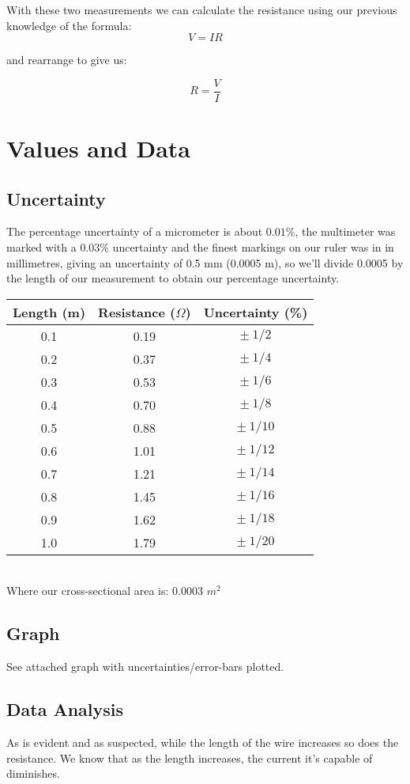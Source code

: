 \documentclass{article}
\begin{document}
With these two measurements we can calculate the resistance using our previous knowledge of the formula: \[V=IR\] \centerline{and rearrange to give us:} \[R=\frac{V}{I}\]

\clearpage

\section[Results]{Values and Data}
\subsection{Uncertainty}
The percentage uncertainty of a micrometer is about $0.01\%$, the multimeter was marked with a $0.03\%$ uncertainty and the finest markings on our ruler was in in millimetres, giving an uncertainty of 0.5 mm (0.0005 m), so we'll divide 0.0005 by the length of our measurement to obtain our percentage uncertainty.

\begin{center}
\begin{tabular}{ |c|c|c| }
 \hline
 Length (m) & Resistance ($\Omega$) & Uncertainty (\%) \\
 \hline
 0.1 & 0.19 & $\pm\ 1/2$ \\ 
 0.2 & 0.37 & $\pm\ 1/4$ \\  
 0.3 & 0.53 & $\pm\ 1/6$ \\
 0.4 & 0.70 & $\pm\ 1/8$ \\
 0.5 & 0.88 & $\pm\ 1/10$ \\
 0.6 & 1.01 & $\pm\ 1/12$ \\
 0.7 & 1.21 & $\pm\ 1/14$ \\
 0.8 & 1.45 & $\pm\ 1/16$ \\
 0.9 & 1.62 & $\pm\ 1/18$ \\
 1.0 & 1.79 & $\pm\ 1/20$ \\
\hline
\end{tabular}
\\ \vspace{2mm} Where our cross-sectional area is: $0.0003$ $m^2$
\end{center}

\subsection{Graph}
See attached graph with uncertainties/error-bars plotted.

\subsection{Data Analysis}
As is evident and as suspected, while the length of the wire increases so does the resistance. We know that as the length increases, the current it's capable of diminishes.\\
\end{document}
